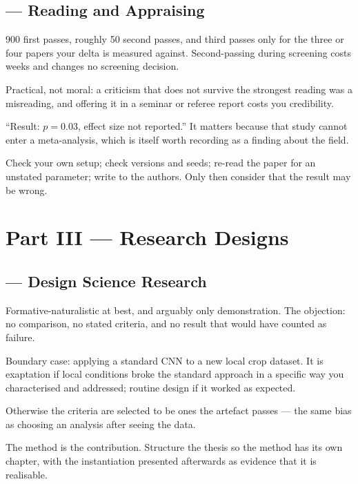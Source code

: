 \subsection*{ --- Reading and Appraising}
\begin{tightnum}
  \item 900 first passes, roughly 50 second passes, and third passes only for
    the three or four papers your delta is measured against. Second-passing
    during screening costs weeks and changes no screening decision.
  \item Practical, not moral: a criticism that does not survive the strongest
    reading was a misreading, and offering it in a seminar or referee report
    costs you credibility.
  \item ``Result: $p = 0.03$, effect size not reported.'' It matters because
    that study cannot enter a meta-analysis, which is itself worth recording as
    a finding about the field.
  \item Check your own setup; check versions and seeds; re-read the paper for an
    unstated parameter; write to the authors. Only then consider that the
    result may be wrong.
\end{tightnum}

\section{Part III --- Research Designs}

\subsection*{ --- Design Science Research}
\begin{tightnum}
  \item Formative-naturalistic at best, and arguably only demonstration. The
    objection: no comparison, no stated criteria, and no result that would have
    counted as failure.
  \item Boundary case: applying a standard CNN to a new local crop dataset. It
    is exaptation if local conditions broke the standard approach in a specific
    way you characterised and addressed; routine design if it worked as
    expected.
  \item Otherwise the criteria are selected to be ones the artefact passes ---
    the same bias as choosing an analysis after seeing the data.
  \item The method is the contribution. Structure the thesis so the method has
    its own chapter, with the instantiation presented afterwards as evidence
    that it is realisable.
\end{tightnum}

